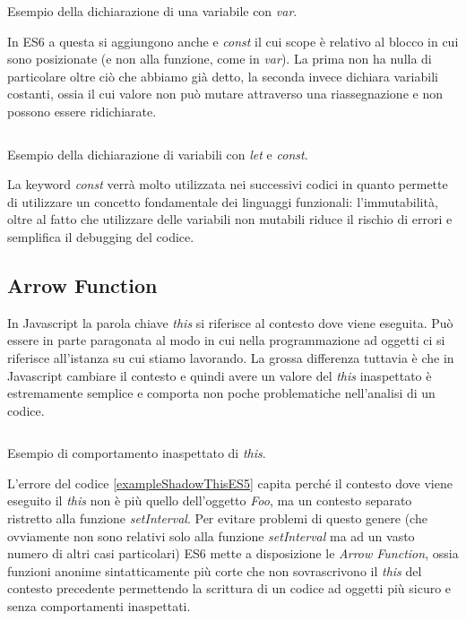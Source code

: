 \begin{listing}[ht]
\inputminted{Javascript}{sources/exampleVarES5.js}
\caption{Esempio della dichiarazione di una variabile con \textit{var}.}
\label{exampleVarES5}
\end{listing}

In ES6 a questa si aggiungono anche  e \textit{const} il cui scope è relativo al blocco in cui sono posizionate (e non alla funzione, come in \textit{var}). La prima non ha nulla di particolare oltre ciò che abbiamo già detto, la seconda invece dichiara variabili costanti, ossia il cui valore non può mutare attraverso una riassegnazione e non possono essere ridichiarate.

\begin{listing}[ht]
\inputminted{Javascript}{sources/exampleLetConstES6.js}
\caption{Esempio della dichiarazione di variabili con \textit{let} e \textit{const}.}
\label{exampleLetConstES6}
\end{listing}

\noindent
La keyword \textit{const} verrà molto utilizzata nei successivi codici in quanto permette di utilizzare un concetto fondamentale dei linguaggi funzionali: l'immutabilità\footnotemark, oltre al fatto che utilizzare delle variabili non mutabili riduce il rischio di errori e semplifica il debugging del codice.

\subsection{Arrow Function}
In Javascript la parola chiave \textit{this} si riferisce al contesto dove viene eseguita. Può essere in parte paragonata al modo in cui nella programmazione ad oggetti ci si riferisce all'istanza su cui stiamo lavorando. La grossa differenza tuttavia è che in Javascript cambiare il contesto e quindi avere un valore del \textit{this} inaspettato è estremamente semplice e comporta non poche problematiche nell'analisi di un codice.

\begin{listing}[ht]
\inputminted{Javascript}{sources/exampleShadowThisES5.js}
\caption{Esempio di comportamento inaspettato di \textit{this}.}
\label{exampleShadowThisES5}
\end{listing}

\noindent
L'errore del codice \ref{exampleShadowThisES5} capita perché il contesto dove viene eseguito il \textit{this} non è più quello dell'oggetto \textit{Foo}, ma un contesto separato ristretto alla funzione \textit{setInterval}. Per evitare problemi di questo genere (che ovviamente non sono relativi solo alla funzione \textit{setInterval} ma ad un vasto numero di altri casi particolari) ES6 mette a disposizione le \textit{Arrow Function}, ossia funzioni anonime sintatticamente più corte che non sovrascrivono il \textit{this} del contesto precedente permettendo la scrittura di un codice ad oggetti più sicuro e senza comportamenti inaspettati.


